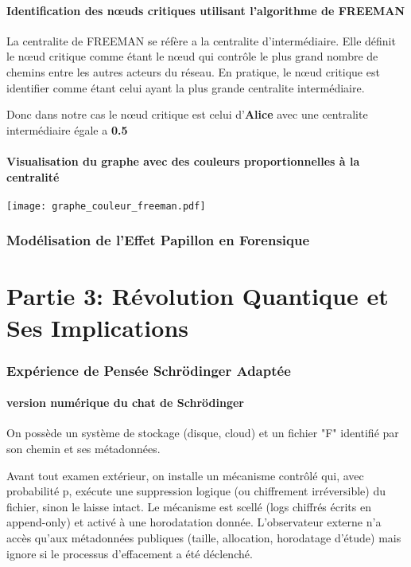 \documentclass[12pt,a4paper]{article}
\begin{document}
	 \subsection{Identification des nœuds critiques utilisant l'algorithme de FREEMAN}
	  La centralite de FREEMAN se réfère a la centralite d'intermédiaire. Elle définit le nœud critique comme étant le nœud qui contrôle le plus grand nombre de chemins entre les autres acteurs du réseau. En pratique, le nœud critique est identifier comme étant celui ayant la plus grande centralite intermédiaire. 
	  
	  Donc dans notre cas le nœud critique est celui d'\textbf{Alice} avec une centralite intermédiaire égale a \textbf{0.5}
	 \subsection{Visualisation du graphe avec des couleurs proportionnelles à la centralité}
	 	\begin{center}
	 		\texttt{[image: graphe\_couleur\_freeman.pdf]}
	 	\end{center}
	 \section{Modélisation de l'Effet Papillon en Forensique}
	 \subsection{}
	 \part*{Partie 3: Révolution Quantique et Ses Implications}
	 \section{Expérience de Pensée Schrödinger Adaptée}
	 \subsection{version numérique du chat de Schrödinger}
	 On possède un système de stockage (disque, cloud) et un fichier "F" identifié par son chemin et ses métadonnées.
	 
	 Avant tout examen extérieur, on installe un mécanisme contrôlé qui, avec probabilité p, exécute une suppression logique (ou chiffrement irréversible) du fichier, sinon le laisse intact. Le mécanisme est scellé (logs chiffrés écrits en append-only) et activé à une horodatation donnée. L’observateur externe n’a accès qu’aux métadonnées publiques (taille, allocation, horodatage d’étude) mais ignore si le processus d’effacement a été déclenché.
	 
\end{document}
